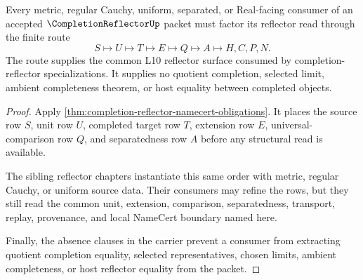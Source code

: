 \begin{theorem}
\label{thm:completion-reflector-l10-route}
Every metric, regular Cauchy, uniform, separated, or Real-facing consumer of an accepted $\CompletionReflectorUp$ packet must factor its reflector read through the finite route
$$
S \longmapsto U \longmapsto T \longmapsto E \longmapsto Q \longmapsto A \longmapsto H,C,P,N .
$$
The route supplies the common L10 reflector surface consumed by completion-reflector specializations. It supplies no quotient completion, selected limit, ambient completeness theorem, or host equality between completed objects.
\end{theorem}
\begin{proof}
Apply \autoref{thm:completion-reflector-namecert-obligations}. It places the source row $S$, unit row $U$, completed target row $T$, extension row $E$, universal-comparison row $Q$, and separatedness row $A$ before any structural read is available.

The sibling reflector chapters instantiate this same order with metric, regular Cauchy, or uniform source data. Their consumers may refine the rows, but they still read the common unit, extension, comparison, separatedness, transport, replay, provenance, and local NameCert boundary named here.

Finally, the absence clauses in the carrier prevent a consumer from extracting quotient completion equality, selected representatives, chosen limits, ambient completeness, or host reflector equality from the packet.
\end{proof}




